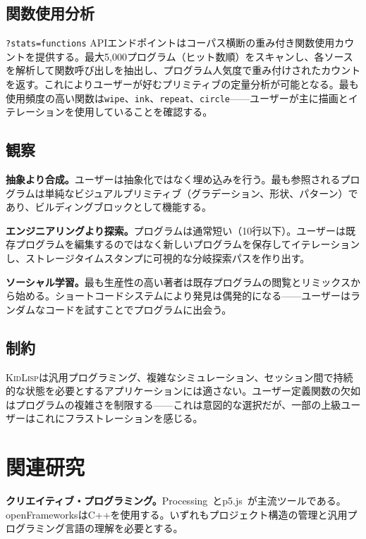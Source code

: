 \documentclass[10pt,letterpaper,twocolumn]{article}
\newcommand{\kidlisp}{\textsc{KidLisp}}
\begin{document}
\subsection{関数使用分析}

\texttt{?stats=functions} APIエンドポイントはコーパス横断の重み付き関数使用カウントを提供する。最大5,000プログラム（ヒット数順）をスキャンし、各ソースを解析して関数呼び出しを抽出し、プログラム人気度で重み付けされたカウントを返す。これによりユーザーが好むプリミティブの定量分析が可能となる。最も使用頻度の高い関数は\texttt{wipe}、\texttt{ink}、\texttt{repeat}、\texttt{circle}——ユーザーが主に描画とイテレーションを使用していることを確認する。

\subsection{観察}

\textbf{抽象より合成。}ユーザーは抽象化ではなく埋め込みを行う。最も参照されるプログラムは単純なビジュアルプリミティブ（グラデーション、形状、パターン）であり、ビルディングブロックとして機能する。

\textbf{エンジニアリングより探索。}プログラムは通常短い（10行以下）。ユーザーは既存プログラムを編集するのではなく新しいプログラムを保存してイテレーションし、ストレージタイムスタンプに可視的な分岐探索パスを作り出す。

\textbf{ソーシャル学習。}最も生産性の高い著者は既存プログラムの閲覧とリミックスから始める。ショートコードシステムにより発見は偶発的になる——ユーザーはランダムなコードを試すことでプログラムに出会う。

\subsection{制約}

\kidlisp{}は汎用プログラミング、複雑なシミュレーション、セッション間で持続的な状態を必要とするアプリケーションには適さない。ユーザー定義関数の欠如はプログラムの複雑さを制限する——これは意図的な選択だが、一部の上級ユーザーはこれにフラストレーションを感じる。

\section{関連研究}

\textbf{クリエイティブ・プログラミング。}Processing~\citep{reas2007processing}とp5.js~\citep{mccarthy2015p5js}が主流ツールである。openFrameworksはC++を使用する。いずれもプロジェクト構造の管理と汎用プログラミング言語の理解を必要とする。
\end{document}
